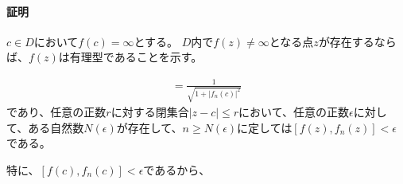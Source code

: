\paragraph{証明}
$c\in D$において$f(c)=\infty$とする。
$D$内で$f(z)\neq\infty$となる点$z$が存在するならば、$f(z)$は有理型であることを示す。

\begin{align*}
    [f(c),f_n(c)]=\frac{1}{\sqrt{1+\left|f_n(c)\right|^2}}
\end{align*}
であり、任意の正数$r$に対する閉集合$|z-c|\le r$において、任意の正数$\epsilon$に対して、ある自然数$N(\epsilon)$が存在して、$n\ge N(\epsilon)$に定しては$[f(z),f_n(z)]<\epsilon$である。

特に、$[f(c),f_n(c)]<\epsilon$であるから、